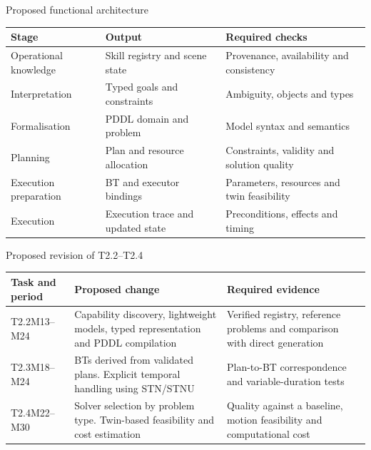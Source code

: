 \documentclass[aspectratio=169,10pt]{beamer}
\begin{document}
\begin{frame}{Proposed functional architecture}
\small\renewcommand{\arraystretch}{1.3}
\begin{tabularx}{\textwidth}{@{}p{}XX@{}}
\toprule
Stage & Output & Required checks\\\midrule
Operational knowledge & Skill registry and scene state & Provenance, availability and consistency\\
Interpretation & Typed goals and constraints & Ambiguity, objects and types\\
Formalisation & PDDL domain and problem & Model syntax and semantics\\
Planning & Plan and resource allocation & Constraints, validity and solution quality\\
Execution preparation & BT and executor bindings & Parameters, resources and twin feasibility\\
Execution & Execution trace and updated state & Preconditions, effects and timing\\\bottomrule
\end{tabularx}
\end{frame}

\begin{frame}{Proposed revision of T2.2--T2.4}
\small\renewcommand{\arraystretch}{1.35}
\begin{tabularx}{\textwidth}{@{}p{}XX@{}}
\toprule
Task and period & Proposed change & Required evidence\\\midrule
T2.2\newline M13--M24 & Capability discovery, lightweight models, typed representation and PDDL compilation & Verified registry, reference problems and comparison with direct generation\\
T2.3\newline M18--M24 & BTs derived from validated plans. Explicit temporal handling using STN/STNU & Plan-to-BT correspondence and variable-duration tests\\
T2.4\newline M22--M30 & Solver selection by problem type. Twin-based feasibility and cost estimation & Quality against a baseline, motion feasibility and computational cost\\\bottomrule
\end{tabularx}
\end{frame}
\end{document}
